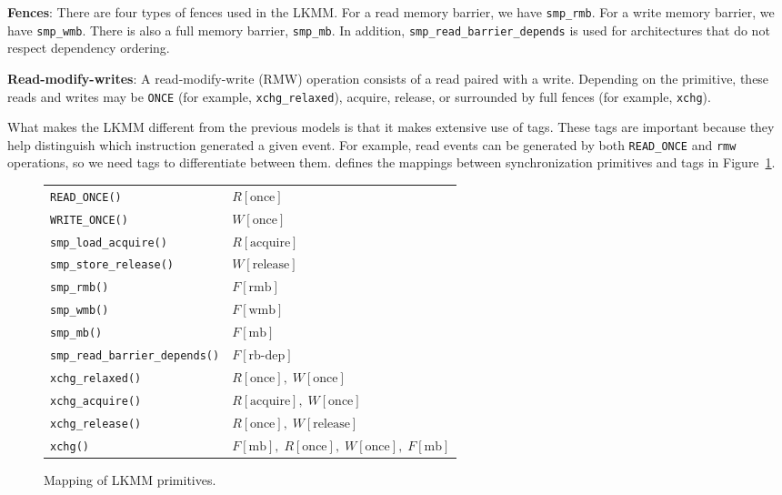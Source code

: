 \textbf{Fences}: There are four types of fences used in the LKMM. For a read
memory barrier, we have \texttt{smp\_rmb}. For a write memory barrier, we have
\texttt{smp\_wmb}. There is also a full memory barrier, \texttt{smp\_mb}. In
addition, \texttt{smp\_read\_barrier\_depends} is used for architectures that do
not respect dependency ordering.

\textbf{Read-modify-writes}: A read-modify-write (RMW) operation consists of a
read paired with a write. Depending on the primitive, these reads and writes
may be \texttt{ONCE} (for example, \texttt{xchg\_relaxed}), acquire, release, or
surrounded by full fences (for example, \texttt{xchg}).

What makes the LKMM different from the previous models is that it makes
extensive use of tags. These tags are important because they help distinguish
which instruction generated a given event. For example, read events can be
generated by both \texttt{READ\_ONCE} and \texttt{rmw} operations, so we need
tags to differentiate between them. \citet{alglave2018frightening} defines the
mappings between synchronization primitives and tags in Figure~\ref{fig:LKMM-events}.

\begin{figure}[h]
\centering
\begin{center}
\begin{tabular}{ll}
\texttt{READ\_ONCE()} & $R[\text{once}]$ \\
\texttt{WRITE\_ONCE()} & $W[\text{once}]$ \\
\texttt{smp\_load\_acquire()} & $R[\text{acquire}]$ \\
\texttt{smp\_store\_release()} & $W[\text{release}]$ \\
\texttt{smp\_rmb()} & $F[\text{rmb}]$ \\
\texttt{smp\_wmb()} & $F[\text{wmb}]$ \\
\texttt{smp\_mb()} & $F[\text{mb}]$ \\
\texttt{smp\_read\_barrier\_depends()} & $F[\text{rb-dep}]$ \\
\texttt{xchg\_relaxed()} & $R[\text{once}],\; W[\text{once}]$ \\
\texttt{xchg\_acquire()} & $R[\text{acquire}],\; W[\text{once}]$ \\
\texttt{xchg\_release()} & $R[\text{once}],\; W[\text{release}]$ \\
\texttt{xchg()} & $F[\text{mb}],\; R[\text{once}],\; W[\text{once}],\; F[\text{mb}]$
\end{tabular}
\end{center}
\caption{Mapping of LKMM primitives.}
\label{fig:LKMM-events}
\end{figure}

